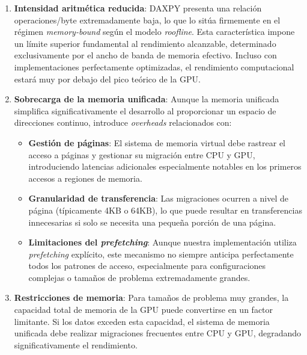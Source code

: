            \begin{enumerate}
            
                \item \textbf{Intensidad aritmética reducida}: DAXPY presenta una relación operaciones/byte extremadamente baja, lo que lo sitúa firmemente en el régimen \textit{memory-bound} según el modelo \textit{roofline}. Esta característica impone un límite superior fundamental al rendimiento alcanzable, determinado exclusivamente por el ancho de banda de memoria efectivo. Incluso con implementaciones perfectamente optimizadas, el rendimiento computacional estará muy por debajo del pico teórico de la GPU.
                
                \item \textbf{Sobrecarga de la memoria unificada}: Aunque la memoria unificada simplifica significativamente el desarrollo al proporcionar un espacio de direcciones continuo, introduce \textit{overheads} relacionados con:
                
                \begin{itemize}
                
                    \item \textbf{Gestión de páginas}: El sistema de memoria virtual debe rastrear el acceso a páginas y gestionar su migración entre CPU y GPU, introduciendo latencias adicionales especialmente notables en los primeros accesos a regiones de memoria.
                    
                    \item \textbf{Granularidad de transferencia}: Las migraciones ocurren a nivel de página (típicamente 4KB o 64KB), lo que puede resultar en transferencias innecesarias si solo se necesita una pequeña porción de una página.
                    
                    \item \textbf{Limitaciones del \textit{prefetching}}: Aunque nuestra implementación utiliza \textit{prefetching} explícito, este mecanismo no siempre anticipa perfectamente todos los patrones de acceso, especialmente para configuraciones complejas o tamaños de problema extremadamente grandes.
                    
                \end{itemize}
                
                \item \textbf{Restricciones de memoria}: Para tamaños de problema muy grandes, la capacidad total de memoria de la GPU puede convertirse en un factor limitante. Si los datos exceden esta capacidad, el sistema de memoria unificada debe realizar migraciones frecuentes entre CPU y GPU, degradando significativamente el rendimiento.
                

\end{enumerate}
